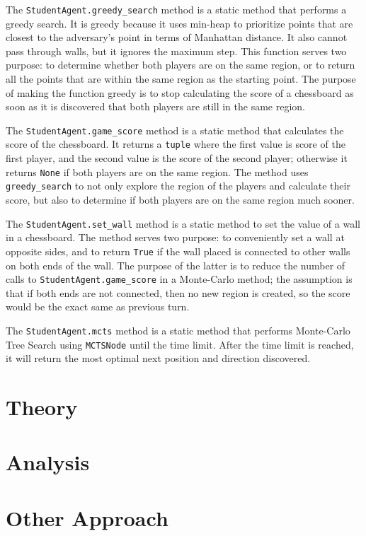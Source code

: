 \documentclass[twoside,11pt]{article}
\begin{document}
The \texttt{StudentAgent.greedy\_search} method is a static method that performs a greedy search.
It is greedy because it uses min-heap to prioritize points that are closest to the adversary's point in terms of Manhattan distance.
It also cannot pass through walls, but it ignores the maximum step.
This function serves two purpose: to determine whether both players are on the same region, or to return all the points that are within the same region as the starting point.
The purpose of making the function greedy is to stop calculating the score of a chessboard as soon as it is discovered that both players are still in the same region.

The \texttt{StudentAgent.game\_score} method is a static method that calculates the score of the chessboard.
It returns a \texttt{tuple} where the first value is score of the first player, and the second value is the score of the second player;
otherwise it returns \texttt{None} if both players are on the same region.
The method uses \texttt{greedy\_search} to not only explore the region of the players and calculate their score, but also to determine if both players are on the same region much sooner.

The \texttt{StudentAgent.set\_wall} method is a static method to set the value of a wall in a chessboard.
The method serves two purpose: to conveniently set a wall at opposite sides, and to return \texttt{True} if the wall placed is connected to other walls on both ends of the wall.
The purpose of the latter is to reduce the number of calls to \texttt{StudentAgent.game\_score} in a Monte-Carlo method;
the assumption is that if both ends are not connected, then no new region is created, so the score would be the exact same as previous turn.

The \texttt{StudentAgent.mcts} method is a static method that performs Monte-Carlo Tree Search using \texttt{MCTSNode} until the time limit.
After the time limit is reached, it will return the most optimal next position and direction discovered.

\section{Theory}

\section{Analysis}

\section{Other Approach}
\end{document}
